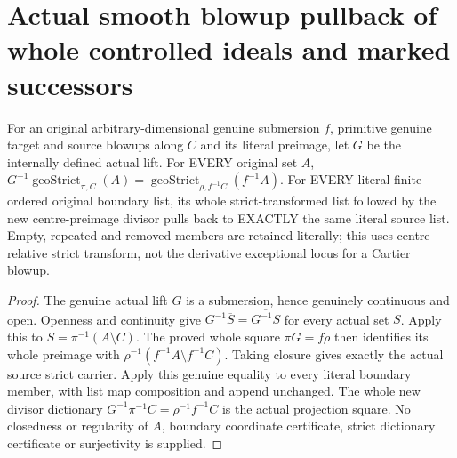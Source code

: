 \section{Actual smooth blowup pullback of whole controlled ideals and marked successors}

\begin{theorem}
\label{hir:submersion-controlled-actual-strict-carriers}
\leanok
{}
For an original arbitrary-dimensional genuine submersion $f$, primitive
genuine target and source blowups along $C$ and its literal preimage, let
$G$ be the internally defined actual lift. For EVERY original set $A$,
$G^{-1}\operatorname{geoStrict}_{\pi,C}(A)
=\operatorname{geoStrict}_{\rho,f^{-1}C}(f^{-1}A)$.
For EVERY literal finite ordered original boundary list, its whole
strict-transformed list followed by the new centre-preimage divisor pulls
back to EXACTLY the same literal source list. Empty, repeated and removed
members are retained literally; this uses centre-relative strict transform,
not the derivative exceptional locus for a Cartier blowup.
\end{theorem}
\begin{proof}
The genuine actual lift $G$ is a submersion, hence genuinely continuous and
open. Openness and continuity give $G^{-1}\overline{S}
=\overline{G^{-1}S}$ for every actual set $S$. Apply this to
$S=\pi^{-1}(A\setminus C)$. The proved whole square $\pi G=f\rho$
then identifies its whole preimage with
$\rho^{-1}(f^{-1}A\setminus f^{-1}C)$. Taking closure gives exactly the
actual source strict carrier. Apply this genuine equality to every literal
boundary member, with list map composition and append unchanged. The whole
new divisor dictionary $G^{-1}\pi^{-1}C=\rho^{-1}f^{-1}C$ is the actual
projection square. No closedness or regularity of $A$, boundary coordinate
certificate, strict dictionary certificate or surjectivity is supplied.
\end{proof}

